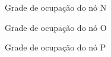 \documentclass{llncs}
\begin{document}
\begin{figure}
	\centering
	\caption{Grade de ocupação do nó N}
	\label{fig:grade_no_N}
\end{figure}
\begin{figure}
	\centering
	\caption{Grade de ocupação do nó O}
	\label{fig:grade_no_O}
\end{figure}
\begin{figure}
	\centering
	\caption{Grade de ocupação do nó P}
	\label{fig:grade_no_P}
\end{figure}
\end{document}
